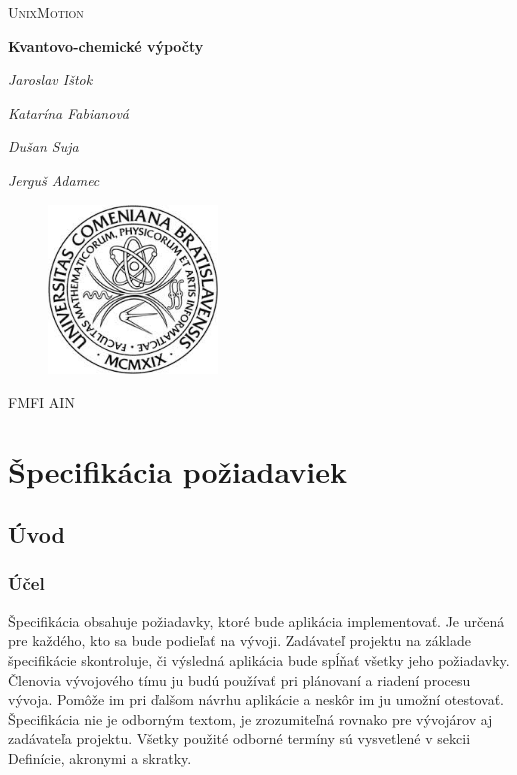 \documentclass[12pt,a4paper]{article}
\begin{document}
	
\begin{titlepage}
	\centering
	\vspace{1cm}
	{\scshape\LARGE UnixMotion} \par
	\vspace{1cm}
	{\huge\bfseries Kvantovo-chemické výpočty} \par
	\vspace{2cm}
	{\Large\itshape Jaroslav Ištok \par}
	{\Large\itshape Katarína Fabianová \par}
	{\Large\itshape Dušan Suja \par}
	{\Large\itshape Jerguš Adamec \par}
	\vfill
	\begin{figure}[H]
		\centering
		\includegraphics[width=0.4\textwidth]{fmfi}
	\end{figure}
	\vspace{2cm}
	{\large FMFI AIN}
\end{titlepage}

\pagebreak

\tableofcontents
\vspace{2cm}
\listoffigures

\pagebreak

\section{Špecifikácia požiadaviek}

\subsection{Úvod}

\subsubsection{Účel}
Špecifikácia obsahuje požiadavky, ktoré bude aplikácia implementovať. Je určená pre každého, kto sa bude podieľať na vývoji. Zadávateľ projektu na základe špecifikácie skontroluje, či výsledná aplikácia bude spĺňať všetky jeho požiadavky. Členovia vývojového tímu ju budú používať pri plánovaní a riadení procesu vývoja. Pomôže im pri ďalšom návrhu aplikácie a neskôr im ju umožní otestovať. Špecifikácia nie je odborným textom, je zrozumiteľná rovnako pre vývojárov aj zadávateľa projektu. Všetky použité odborné termíny sú vysvetlené v sekcii Definície, akronymi a skratky.
\end{document}

